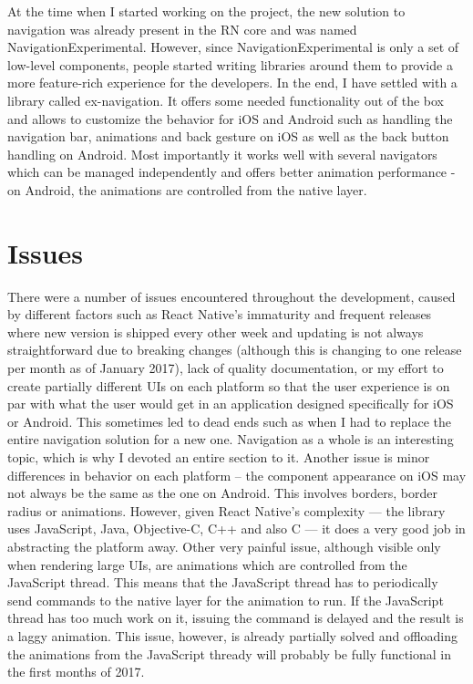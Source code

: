 At the time when I started working on the project, the new solution to navigation was already present in the RN core and was named NavigationExperimental. However, since NavigationExperimental is only a set of low-level components, people started writing libraries around them to provide a more feature-rich experience for the developers. In the end, I have settled with a library called ex-navigation. It offers some needed functionality out of the box and allows to customize the behavior for iOS and Android such as handling the navigation bar, animations and back gesture on iOS as well as the back button handling on Android. Most importantly it works well with several navigators which can be managed independently and offers better animation performance - on Android, the animations are controlled from the native layer.

\section{Issues}

There were a number of issues encountered throughout the development, caused by different factors such as React Native's immaturity and frequent releases where new version is shipped every other week and updating is not always straightforward due to breaking changes (although this is changing to one release per month as of January 2017), lack of quality documentation, or my effort to create partially different UIs on each platform so that the user experience is on par with what the user would get in an application designed specifically for iOS or Android. This sometimes led to dead ends such as when I had to replace the entire navigation solution for a new one. Navigation as a whole is an interesting topic, which is why I devoted an entire section to it.
Another issue is minor differences in behavior on each platform -- the component appearance on iOS may not always be the same as the one on Android. This involves borders, border radius or animations. However, given React Native's complexity --- the library uses JavaScript, Java, Objective-C, C++ and also C --- it does a very good job in abstracting the platform away.
Other very painful issue, although visible only when rendering large UIs, are animations which are controlled from the JavaScript thread. This means that the JavaScript thread has to periodically send commands to the native layer for the animation to run. If the JavaScript thread has too much work on it, issuing the command is delayed and the result is a laggy animation. This issue, however, is already partially solved and offloading the animations from the JavaScript thready will probably be fully functional in the first months of 2017.


